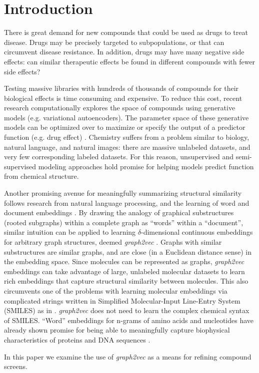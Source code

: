 \section{Introduction}

There is great demand for new compounds that could be used as drugs to treat disease. Drugs may be precisely targeted to subpopulations, or that can circumvent disease resistance. In addition, drugs may have many negative side effects: can similar therapeutic effects be found in different compounds with fewer side effects?

Testing massive libraries with hundreds of thousands of compounds for their biological effects is time consuming and expensive. To reduce this cost, recent research computationally explores the space of compounds using generative models (e.g. variational autoencoders). The parameter space of these generative models can be optimized over to maximize or specify the output of a predictor function (e.g. drug effect) \cite{Brookes2018} \cite{Gomez-Bombarelli2018}. Chemistry suffers from a problem similar to biology, natural language, and natural images: there are massive unlabeled datasets, and very few corresponding labeled datasets. For this reason, unsupervised and semi-supervised modeling approaches hold promise for helping models predict function from chemical structure.

Another promising avenue for meaningfully summarizing structural similarity follows research from natural language processing, and the learning of word and document embeddings \cite{Goldberg2014}. By drawing the analogy of graphical substructures (rooted subgraphs) within a complete graph as ``words'' within a ``document'', similar intuition can be applied to learning $\delta$-dimensional continuous embeddings for arbitrary graph structures, deemed \textit{graph2vec} \cite{Narayanan}. Graphs with similar substructures are similar graphs, and are close (in a Euclidean distance sense) in the embedding space. Since molecules can be represented as graphs, \textit{graph2vec} embeddings can take advantage of large, unlabeled molecular datasets to learn rich embeddings that capture structural similarity between molecules. This also circumvents one of the problems with learning molecular embeddings via complicated strings written in Simplified Molecular-Input Line-Entry System (SMILES) as in \cite{Gomez-Bombarelli2018}. \textit{graph2vec} does not need to learn the complex chemical syntax of SMILES. ``Word'' embeddings for n-grams of amino acids and nucleotides have already shown promise for being able to meaningfully capture biophysical characteristics of proteins and DNA sequences \cite{Hamid2018} \cite{Asgari2015}.

In this paper we examine the use of \textit{graph2vec} as a means for refining compound screens.
